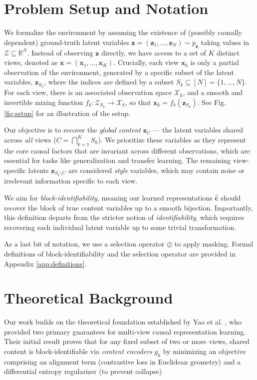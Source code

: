 \documentclass[a4paper,12pt]{article}
\begin{document}
\section{Problem Setup and Notation} \label{sec:theory}
We formalize the environment by assuming the existence of (possibly causally dependent) ground-truth latent variables $\mathbf{z} = (\mathbf{z}_1, \dots, \mathbf{z}_N) \sim p_{\mathbf{z}}$ taking values in $\mathcal{Z} \subseteq \mathbb{R}^N$. Instead of observing $\mathbf{z}$ directly, we have access to a set of $K$ distinct views, denoted as $\mathbf{x} = (\mathbf{x}_1, \dots, \mathbf{x}_K)$. Crucially, each view $\mathbf{x}_k$ is only a partial observation of the environment, generated by a specific subset of the latent variables, $\mathbf{z}_{S_k}$, where the indices are defined by a subset $S_k \subseteq [N]=\{1, \dots, N\}$. For each view, there is an associated observation space $\mathcal{X}_k$, and a smooth and invertible mixing function $f_k : \mathcal{Z}_{S_{k}} \to \mathcal{X}_{k}$, so that $\mathbf{x}_k = f_k(\mathbf{z}_{S_k})$. See Fig. \ref{fig:setup} for an illustration of the setup.

Our objective is to recover the \textit{global content} $\mathbf{z}_C$ — the latent variables shared across \textit{all} views ($C = \bigcap_{k=1}^K S_k$). We prioritize these variables as they represent the core causal factors that are invariant across different observations, which are essential for tasks like generalization and transfer learning. The remaining view-specific latents $\mathbf{z}_{S_k \setminus C}$ are considered \textit{style} variables, which may contain noise or irrelevant information specific to each view.

We aim for \textit{block-identifiability}, meaning our learned representations $\hat{\mathbf{c}}$ should recover the block of true content variables up to a smooth bijection. Importantly, this definition departs from the stricter notion of \textit{identifiability}, which requires recovering each individual latent variable up to some trivial transformation.

As a last bit of notation, we use a selection operator $\oslash$ to apply masking. Formal definitions of block-identifiability and the selection operator are provided in Appendix \ref{app:definitions}.

\section{Theoretical Background} \label{sec:Theory}
Our work builds on the theoretical foundation established by Yao et al. \cite{yao2024multiviewcausalrepresentationlearning}, who provided two primary guarantees for multi-view causal representation learning. Their initial result proves that for any fixed subset of two or more views, shared content is block-identifiable via \textit{content encoders} $g_k$ by minimizing an objective comprising an alignment term (contrastive loss in Euclidean geometry) and a differential entropy regularizer (to prevent collapse)
\end{document}
